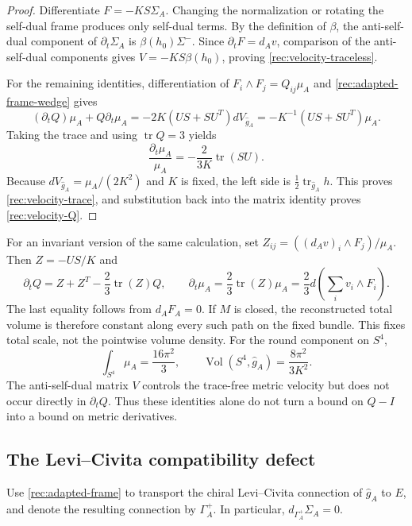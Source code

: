 \documentclass[11pt]{article}
\numberwithin{equation}{section}
\theoremstyle{definition}
\theoremstyle{remark}
\begin{document}
\begin{proof}
Differentiate $F=-KS\Sigma_A$.  Changing the normalization or rotating
the self-dual frame produces only self-dual terms.  By the definition
of $\beta$, the anti-self-dual component of
$\partial_t\Sigma_A$ is $\beta(h_0)\Sigma^-$.  Since
$\partial_tF=d_Av$, comparison of the anti-self-dual components gives
$V=-KS\beta(h_0)$, proving \eqref{rec:velocity-traceless}.

For the remaining identities, differentiation of
$F_i\wedge F_j=Q_{ij}\mu_A$ and
\eqref{rec:adapted-frame-wedge} gives
\[
 (\partial_tQ)\mu_A+Q\partial_t\mu_A
       =-2K(US+SU^T)dV_{\widehat g_A}
       =-K^{-1}(US+SU^T)\mu_A.
\]
Taking the trace and using $\operatorname{tr}Q=3$ yields
\begin{equation}
 \frac{\partial_t\mu_A}{\mu_A}
       =-\frac2{3K}\operatorname{tr}(SU).
 \label{rec:mu-velocity}
\end{equation}
Because $dV_{\widehat g_A}=\mu_A/(2K^2)$ and $K$ is fixed, the
left side is $\tfrac12\operatorname{tr}_{\widehat g_A}h$.
This proves \eqref{rec:velocity-trace}, and substitution back into
the matrix identity proves \eqref{rec:velocity-Q}.
\end{proof}

For an invariant version of the same calculation, set
$Z_{ij}=((d_Av)_i\wedge F_j)/\mu_A$.  Then $Z=-US/K$ and
\begin{equation}
 \partial_tQ=Z+Z^T-\frac23\operatorname{tr}(Z)Q,
 \qquad
 \partial_t\mu_A=\frac23\operatorname{tr}(Z)\mu_A
                =\frac23d\left(\sum_i v_i\wedge F_i\right).
 \label{rec:invariant-velocities}
\end{equation}
The last equality follows from $d_AF_A=0$.
If $M$ is closed, the reconstructed total volume is therefore constant
along every such path on the fixed bundle.  This fixes total scale,
not the pointwise volume density.  For the round component on $S^4$,
\[
 \int_{S^4}\mu_A=\frac{16\pi^2}{3},\qquad
 \operatorname{Vol}(S^4,\widehat g_A)=\frac{8\pi^2}{3K^2}.
\]
The anti-self-dual matrix $V$ controls the trace-free metric velocity
but does not occur directly in $\partial_tQ$.  Thus these identities
alone do not turn a bound on $Q-I$ into a bound on metric derivatives.

\subsection{The Levi--Civita compatibility defect}

Use \eqref{rec:adapted-frame} to transport the chiral Levi--Civita
connection of $\widehat g_A$ to $E$, and denote the resulting connection
by $\Gamma_A^+$.  In particular, $d_{\Gamma_A^+}\Sigma_A=0$.
\end{document}
